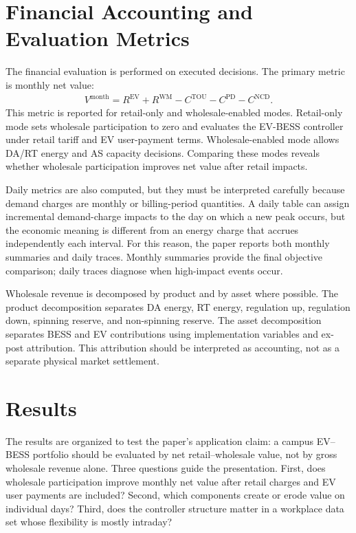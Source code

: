 \documentclass[final,5p,times]{elsarticle}
\newcommand{\EV}{\mathrm{EV}}
\newcommand{\TOU}{\mathrm{TOU}}
\newcommand{\PD}{\mathrm{PD}}
\newcommand{\NCD}{\mathrm{NCD}}
\newcommand{\WM}{\mathrm{WM}}
\begin{document}
\section{Financial Accounting and Evaluation Metrics}
\label{sec:metrics}

The financial evaluation is performed on executed decisions. The primary metric is monthly net value:
\begin{align}
V^{\mathrm{month}}=R^{\EV}+R^{\WM}-C^{\TOU}-C^{\PD}-C^{\NCD}.
\label{eq:month_value_metric}
\end{align}
This metric is reported for retail-only and wholesale-enabled modes. Retail-only mode sets wholesale participation to zero and evaluates the EV-BESS controller under retail tariff and EV user-payment terms. Wholesale-enabled mode allows DA/RT energy and AS capacity decisions. Comparing these modes reveals whether wholesale participation improves net value after retail impacts.

Daily metrics are also computed, but they must be interpreted carefully because demand charges are monthly or billing-period quantities. A daily table can assign incremental demand-charge impacts to the day on which a new peak occurs, but the economic meaning is different from an energy charge that accrues independently each interval. For this reason, the paper reports both monthly summaries and daily traces. Monthly summaries provide the final objective comparison; daily traces diagnose when high-impact events occur.

Wholesale revenue is decomposed by product and by asset where possible. The product decomposition separates DA energy, RT energy, regulation up, regulation down, spinning reserve, and non-spinning reserve. The asset decomposition separates BESS and EV contributions using implementation variables and ex-post attribution. This attribution should be interpreted as accounting, not as a separate physical market settlement.

\section{Results}
\label{sec:results}

The results are organized to test the paper's application claim: a campus EV--BESS portfolio should be evaluated by net retail--wholesale value, not by gross wholesale revenue alone. Three questions guide the presentation. First, does wholesale participation improve monthly net value after retail charges and EV user payments are included? Second, which components create or erode value on individual days? Third, does the controller structure matter in a workplace data set whose flexibility is mostly intraday?
\end{document}
